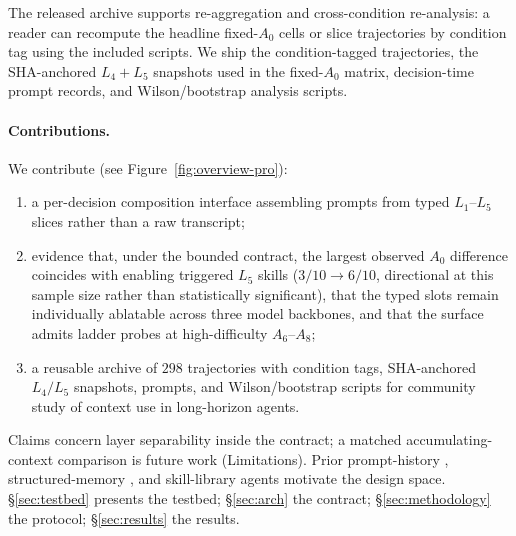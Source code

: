 The released archive supports re-aggregation and cross-condition
re-analysis: a reader can recompute the headline fixed-$A_0$ cells
or slice trajectories by condition tag using the included scripts.
We ship the condition-tagged trajectories, the SHA-anchored
$L_4{+}L_5$ snapshots used in the fixed-$A_0$ matrix, decision-time
prompt records, and Wilson/bootstrap analysis scripts.

\paragraph{Contributions.}
We contribute (see Figure~\ref{fig:overview-pro}):
\begin{enumerate}[leftmargin=1.5em,labelsep=0.3em,itemsep=0pt,topsep=0pt,partopsep=0pt,parsep=0pt,label=(\roman*)]
\item a per-decision composition interface assembling prompts
from typed $L_1$--$L_5$ slices rather than a raw transcript;
\item evidence that, under the bounded contract, the largest
observed $A_0$ difference coincides with enabling triggered $L_5$
skills ($3/10\to6/10$, directional at this sample size rather than
statistically significant), that the typed slots remain individually
ablatable across three model backbones, and that the surface admits
ladder probes at high-difficulty $A_6$--$A_8$;
\item a reusable archive of $298$ trajectories with condition
tags, SHA-anchored $L_4/L_5$ snapshots, prompts, and
Wilson/bootstrap scripts for community study of context use in
long-horizon agents.
\end{enumerate}
Claims concern layer separability inside the contract; a matched
accumulating-context comparison is future work (Limitations).
Prior prompt-history \citep{react2023,reflexion2023,voyager2023},
structured-memory \citep{memgpt2024,mem0-2025,memoryos2025,gam-2026},
and skill-library agents \citep{skillsbench2026,skillos2026,%
memento-skills-2026} motivate the design space.
\S\ref{sec:testbed} presents the testbed; \S\ref{sec:arch} the
contract; \S\ref{sec:methodology} the protocol;
\S\ref{sec:results} the results.
